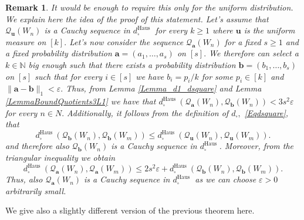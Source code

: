 \documentclass[11pt]{article}
\newtheorem{remark}[theorem]{Remark}
\def\N{\mathbb{N}}
\begin{document}
\begin{remark}
It would be enough to require this only for the uniform distribution. We explain here the idea of the proof of this statement. Let's assume that  $\mathcal{Q}_{\mathbf{u}}\left(W_n\right)$ is a Cauchy sequence in $d_{\square}^{\text {Haus }}$ for every $k \geq 1$ where $\mathbf{u}$ is the uniform measure on $[k].$ Let's now consider the sequence $\mathcal{Q}_{\mathbf{a}}\left(W_n\right)$ for a fixed $s \geq 1$ and a fixed probability distribution $\mathbf{a}=(a_1,\ldots,a_s)$ on $[s].$ We therefore can select a $k\in \N$ big enough such that there exists a probability distribution $\mathbf{b}=(b_1,\ldots,b_s)$ on $[s]$ such that for every $i\in [s]$ we have $b_i=p_i/k$ for some $p_i\in [k]$ and $\|\mathbf{a}-\mathbf{b}\|_1<\varepsilon.$ Thus, from Lemma \ref{Lemma_d1_dsquare} and Lemma \ref{LemmaBoundQuotients3L1} we have that $
d_{\square}^{\text {Haus }}(\mathcal{Q}_{\mathbf{a}}\left(W_n\right),\mathcal{Q}_{\mathbf{b}}\left(W_n\right))<3s^2\varepsilon
$ for every $n\in N.$ Additionally, it follows from the definition of  $d_{\square},$ \eqref{Eqdsquare}, that
$$
d_{\square}^{\text {Haus }}(\mathcal{Q}_{\mathbf{b}}\left(W_n\right),\mathcal{Q}_{\mathbf{b}}\left(W_m\right))\leq d_{\square}^{\text {Haus }}(\mathcal{Q}_{\mathbf{u}}\left(W_n\right),\mathcal{Q}_{\mathbf{u}}\left(W_m\right)).
$$
and therefore also $\mathcal{Q}_{\mathbf{b}}\left(W_n\right)$ is a Cauchy sequence in $d_{\square}^{\text {Haus }}$.
Moreover, from the triangular inequality we obtain $$
d_{\square}^{\text {Haus }}(\mathcal{Q}_{\mathbf{a}}\left(W_n\right),\mathcal{Q}_{\mathbf{a}}\left(W_m\right))\leq2 s^2\varepsilon+d_{\square}^{\text {Haus }}(\mathcal{Q}_{\mathbf{b}}\left(W_n\right),\mathcal{Q}_{\mathbf{b}}\left(W_m\right)).
$$
Thus, also $\mathcal{Q}_{\mathbf{a}}\left(W_n\right)$ is a Cauchy sequence in $d_{\square}^{\text {Haus }}$ as we can choose $\varepsilon>0$ arbitrarily small. 
\end{remark}

We give also a slightly different version of the previous theorem here.
\end{document}

